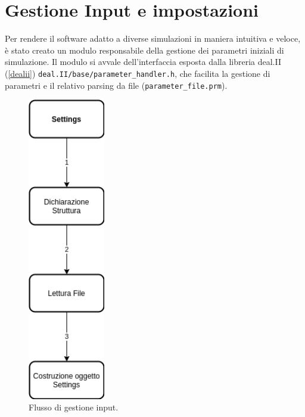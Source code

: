     \section{Gestione Input e impostazioni}\label{input}\label{settings}
    Per rendere il software adatto a diverse simulazioni in maniera intuitiva e veloce, è stato creato un modulo responsabile della gestione dei parametri iniziali di simulazione.
    Il modulo si avvale dell'interfaccia esposta dalla libreria deal.II (\ref{dealii}) \newline\texttt{deal.II\//base\//parameter\_handler.h}\label{parameterhandler}, che facilita la gestione di parametri e il
    relativo parsing da file (\texttt{parameter\_file.prm}).
    \begin{figure}[H]
        \centering
        \includegraphics[width=0.3\textwidth]{diagrammi/diagrammiInput.png}
        \caption{Flusso di gestione input.}
    \end{figure}


